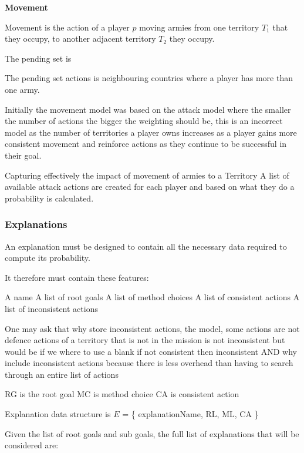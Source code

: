 \documentclass[parskip]{cs4rep}
\begin{document}
\textbf{Movement}

Movement is the action of a player $p$ moving armies from one territory $T_{1}$ that they occupy, to another adjacent territory $T_{2}$ they occupy.

The pending set is 

The pending set actions is neighbouring countries where a player has more than one army.

Initially the movement model was based on the attack model where the smaller the number of actions the bigger the weighting should be, this is an incorrect model as the number of territories a player owns increases as a player gains more consistent movement and reinforce actions as they continue to be successful in their goal.

Capturing effectively the impact of movement of armies to a Territory 
A list of available attack actions are created for each player and based on what they do a probability is calculated.

\subsubsection{Explanations}

An explanation must be designed to contain all the necessary data required to compute its probability.

It therefore must contain these features:

A name
A list of root goals
A list of method choices
A list of consistent actions
A list of inconsistent actions

One may ask that why store inconsistent actions, the model, some actions are not defence actions of a territory that is not in the mission is not inconsistent but would be if we where to use a blank if not consistent then inconsistent AND why include inconsistent actions because there is less overhead than having to search through an entire list of actions

RG is the root goal
MC is method choice
CA is consistent action

Explanation data structure is $E$ = \{ explanationName, RL, ML, CA \}

Given the list of root goals and sub goals, the full list of explanations that will be considered are:
\end{document}
